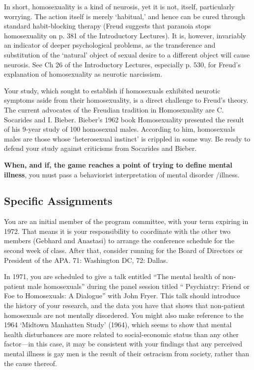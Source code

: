 In short, homosexuality is a kind of neurosis, yet it is not, itself, particularly worrying. The action itself is merely `habitual,' and hence can be cured through standard habit-blocking therapy (Freud suggests that paranoia stops homosexuality on p. 381 of the Introductory Lectures). It is, however, invariably an indicator of deeper psychological problems, as the transference and substitution of the `natural' object of sexual desire to a different object will cause neurosis. See Ch 26 of the Introductory Lectures, especially p. 530, for Freud's explanation of homosexuality as neurotic narcissism.

Your study, which sought to establish if homosexuals exhibited neurotic symptoms aside from their homosexuality, is a direct challenge to Freud's theory. The current advocates of the Freudian tradition in Homosexuality are C. Socarides and I. Bieber. Bieber's 1962 book Homosexuality presented the result of his 9-year study of 100 homosexual males. According to him, homosexuals males are those whose `heterosexual instinct' is crippled in some way. Be ready to defend your study against criticisms from Socarides and Bieber.

\textbf{When, and if, the game reaches a point of trying to define mental illness}, you must pass a behaviorist interpretation of mental disorder \slash  illness.

\subsection{Specific Assignments}
\label{specificassignments}

You are an initial member of the program committee, with your term expiring in 1972. That means it is your responsibility to coordinate with the other two members (Gebhard and Anastasi) to arrange the conference schedule for the second week of class. After that, consider running for the Board of Directors or President of the APA. 71: Washington DC, 72: Dallas.

In 1971, you are scheduled to give a talk entitled ``The mental health of non-patient male homosexuals'' during the panel session titled `` Psychiatry: Friend or Foe to Homosexuals: A Dialogue'' with John Fryer. This talk should introduce the history of your research, and the data you have that shows that non-patient homosexuals are not mentally disordered. You might also make reference to the 1964 `Midtown Manhatten Study' (1964), which seems to show that mental health disturbances are more related to social-economic status than any other factor---in this case, it may be consistent with your findings that any perceived mental illness is gay men is the result of their ostracism from society, rather than the cause thereof. 


